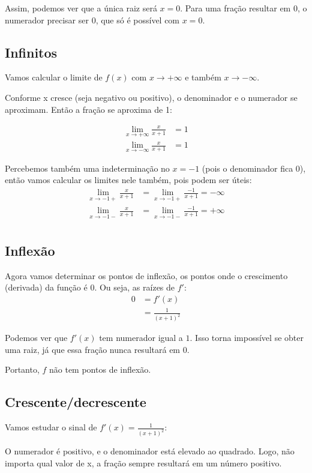 \documentclass[12pt]{article}
\theoremstyle{definition}
\begin{document}
Assim, podemos ver que a única raiz será \(x=0\). Para uma fração resultar em \(0\), o numerador precisar ser \(0\), que só é possível com \(x=0\).
\subsection{Infinitos}
Vamos calcular o limite de \(f(x)\) com \(x\rightarrow+\infty\) e também \(x\rightarrow-\infty\).

Conforme x cresce (seja negativo ou positivo), o denominador e o numerador se aproximam. Então a fração se aproxima de 1:

\begin{align*}
    \lim_{x\rightarrow+\infty} \frac{x}{x+1} &= 1 \\
    \lim_{x\rightarrow-\infty} \frac{x}{x+1} &= 1
\end{align*}

Percebemos também uma indeterminação no \(x = -1\) (pois o denominador fica \(0\)), então vamos calcular os limites nele também, pois podem ser úteis:
\begin{align*}
    \lim_{x\rightarrow-1+} \frac{x}{x+1} &= \lim_{x\rightarrow-1+} \frac{-1}{x+1} = -\infty \\
    \lim_{x\rightarrow-1-} \frac{x}{x+1} &= \lim_{x\rightarrow-1-} \frac{-1}{x+1} = +\infty \\
\end{align*}
\subsection{Inflexão}
Agora vamos determinar os pontos de inflexão, os pontos onde o crescimento (derivada) da função é \(0\). Ou seja, as raízes de \(f'\):
\begin{align*}
    0
    &= f'(x) \\
    &= \frac{1}{{(x+1)}^2}
\end{align*}

Podemos ver que \(f'(x)\) tem numerador igual a \(1\). Isso torna impossível se obter uma raiz, já que essa fração nunca resultará em 0.

Portanto, \(f\) não tem pontos de inflexão.
\subsection{Crescente/decrescente}
Vamos estudar o sinal de \(f'(x) = \frac{1}{{(x+1)}^2}\):

O numerador é positivo, e o denominador está elevado ao quadrado. Logo, não importa qual valor de x, a fração sempre resultará em um número positivo.
\end{document}
